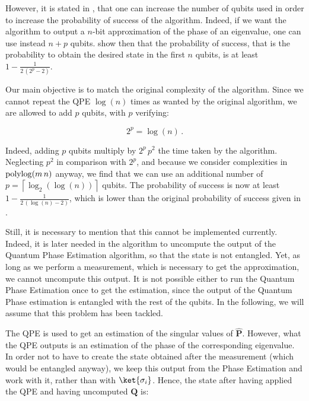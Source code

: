 \documentclass[11pt, a4paper]{article}
\begin{document}
            However, it is stated in \cite{QCAQI}, that one can increase the number of qubits used in order to increase the probability of success of the algorithm. Indeed, if we want the algorithm to output a \(n\)-bit approximation of the phase of an eigenvalue, one can use instead \(n+p\) qubits. \citeauthor{QCAQI} show then that the probability of success, that is the probability to obtain the desired state in the first \(n\) qubits, is at least \(1-\frac{1}{2\,\left(2^p-2\right)}\).
            
            Our main objective is to match the original complexity of the algorithm. Since we cannot repeat the QPE \(\log(n)\) times as wanted by the original algorithm, we are allowed to add \(p\) qubits, with \(p\) verifying:
            
            \[2^p=\log(n)\,.\]
            
            Indeed, adding \(p\) qubits multiply by \(2^p\,p^2\) the time taken by the algorithm. Neglecting \(p^2\) in comparison with \(2^p\), and because we consider complexities in \(\operatorname{polylog}(m\,n)\) anyway, we find that we can use an additional number of \(p=\left\lceil\log_2(\log(n))\right\rceil\) qubits. The probability of success is now at least \(1-\frac{1}{2\,\left(\log(n) - 2\right)}\), which is lower than the original probability of success given in \cite{QRS}.
            
            Still, it is necessary to mention that this cannot be implemented currently. Indeed, it is later needed in the algorithm to uncompute the output of the Quantum Phase Estimation algorithm, so that the state is not entangled. Yet, as long as we perform a measurement, which is necessary to get the approximation, we cannot uncompute this output. It is not possible either to run the Quantum Phase Estimation once to get the estimation, since the output of the Quantum Phase estimation is entangled with the rest of the qubits. In the following, we will assume that this problem has been tackled.
            
            The QPE is used to get an estimation of the singular values of \(\hat{\mathbf{P}}\). However, what the QPE outputs is an estimation of the phase of the corresponding eigenvalue. In order not to have to create the state  obtained after the measurement (which would be entangled anyway), we keep this output from the Phase Estimation and work with it, rather than with \(\ket{\sigma_i}\). Hence, the state after having applied the QPE and having uncomputed \(\mathbf{Q}\) is:
            
\end{document}
